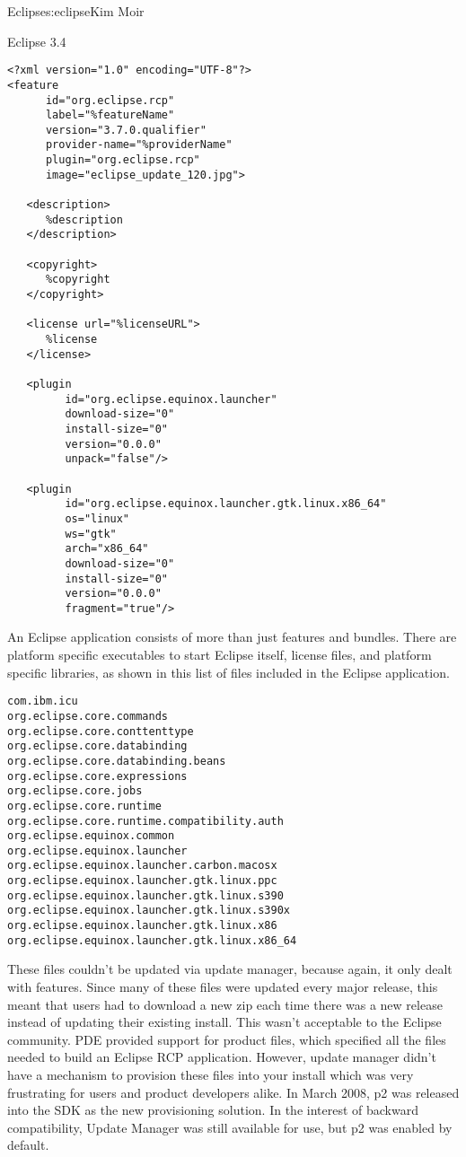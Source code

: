 \begin{aosachapter}{Eclipse}{s:eclipse}{Kim Moir}
\begin{aosasect1}{Eclipse 3.4}
\begin{verbatim}
<?xml version="1.0" encoding="UTF-8"?>
<feature
      id="org.eclipse.rcp"
      label="%featureName"
      version="3.7.0.qualifier"
      provider-name="%providerName"
      plugin="org.eclipse.rcp"
      image="eclipse_update_120.jpg">

   <description>
      %description
   </description>

   <copyright>
      %copyright
   </copyright>

   <license url="%licenseURL">
      %license
   </license>
 
   <plugin
         id="org.eclipse.equinox.launcher"
         download-size="0"
         install-size="0"
         version="0.0.0"
         unpack="false"/>

   <plugin
         id="org.eclipse.equinox.launcher.gtk.linux.x86_64"
         os="linux"
         ws="gtk"
         arch="x86_64"
         download-size="0"
         install-size="0"
         version="0.0.0"
         fragment="true"/>
\end{verbatim}

An Eclipse application consists of more than just features and
bundles.  There are platform specific executables to start Eclipse
itself, license files, and platform specific libraries, as shown in
this list of files included in the Eclipse application.

\begin{verbatim}
com.ibm.icu
org.eclipse.core.commands
org.eclipse.core.conttenttype
org.eclipse.core.databinding
org.eclipse.core.databinding.beans
org.eclipse.core.expressions
org.eclipse.core.jobs
org.eclipse.core.runtime
org.eclipse.core.runtime.compatibility.auth
org.eclipse.equinox.common
org.eclipse.equinox.launcher
org.eclipse.equinox.launcher.carbon.macosx
org.eclipse.equinox.launcher.gtk.linux.ppc
org.eclipse.equinox.launcher.gtk.linux.s390
org.eclipse.equinox.launcher.gtk.linux.s390x
org.eclipse.equinox.launcher.gtk.linux.x86
org.eclipse.equinox.launcher.gtk.linux.x86_64
\end{verbatim}


These files couldn't be updated via
update manager, because again, it only dealt with features.
Since many of these files were updated every major release, this meant
that users had to download a new zip each time there was a new release
instead of updating their existing install. This wasn't acceptable to
the Eclipse community. PDE provided support for product files, which
specified all the files needed to build an Eclipse RCP
application. However, update manager didn't have a mechanism to
provision these files into your install which was very frustrating for
users and product developers alike. In March 2008, p2 was released
into the SDK as the new provisioning solution.  In the interest of
backward compatibility, Update Manager was still available for use,
but p2 was enabled by default.


\end{aosasect1}
\end{aosachapter}
